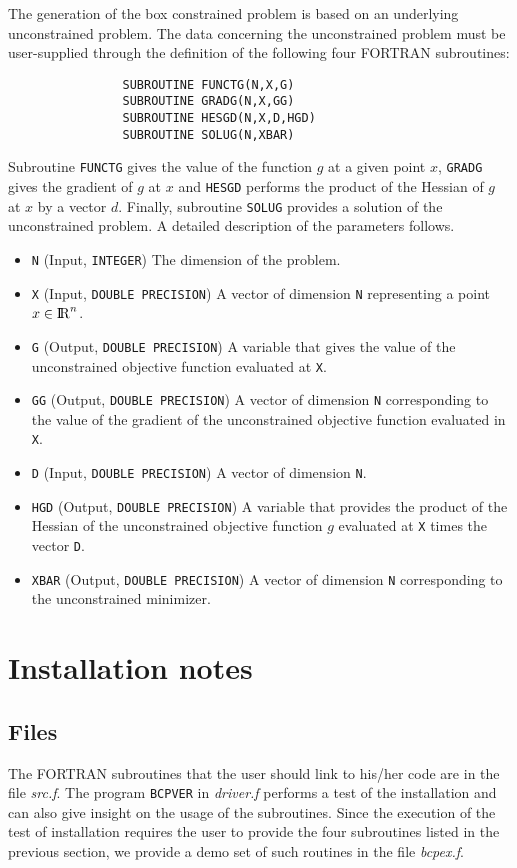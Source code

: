 The generation of the box constrained problem is based on
an underlying unconstrained problem. The data concerning the unconstrained
problem must be user-supplied through the definition of the following 
four FORTRAN
subroutines: 

\begin{verbatim}
                SUBROUTINE FUNCTG(N,X,G)
                SUBROUTINE GRADG(N,X,GG)
                SUBROUTINE HESGD(N,X,D,HGD)
                SUBROUTINE SOLUG(N,XBAR)                
\end{verbatim}

Subroutine {\tt FUNCTG\/} gives the value of the function $g$ at a 
given point $x$, {\tt GRADG\/} gives the gradient of $g$  at $x$  
and {\tt HESGD\/} performs
the product of the Hessian of $g$ at $x$ by a vector $d$. Finally,
subroutine {\tt SOLUG\/} provides a solution of the unconstrained 
problem. A detailed description of the
parameters follows.

\begin{itemize}
\item {\tt N} (Input, {\tt INTEGER}) The dimension of the problem.
\item {\tt X} (Input,  {\tt DOUBLE PRECISION}) A vector of dimension {\tt N}
representing a point $x \in {\rm I\kern-.17em R}^n$.
\item {\tt G} (Output, {\tt DOUBLE PRECISION}) A variable that gives the value of the
unconstrained objective function evaluated at {\tt X}.
\item {\tt GG} (Output, {\tt DOUBLE PRECISION}) A vector of dimension {\tt N} 
corresponding to the value of the
gradient  of the unconstrained objective function evaluated in {\tt X}.
\item {\tt D} (Input, {\tt DOUBLE PRECISION}) A vector of dimension {\tt N}.
\item {\tt HGD} (Output, {\tt DOUBLE PRECISION}) A variable that provides the product 
of the Hessian of the
unconstrained objective function $g$ evaluated at {\tt X} times the vector 
{\tt D}.
\item {\tt XBAR} (Output, {\tt DOUBLE PRECISION}) A vector of dimension {\tt N} 
corresponding to the unconstrained minimizer. 
\end{itemize}

\section{\label{install}Installation notes}

\subsection{Files}
The FORTRAN subroutines that the user 
should link to his/her code are in the file {\em src.f}. 
The program {\tt BCPVER} in {\em driver.f} performs a test of the 
installation and can also
give insight on the usage of the subroutines. 
Since the execution of the test of installation requires 
the user to provide the four subroutines listed in the previous section,
     we provide a demo set of such routines in the file  {\em bcpex.f}.



